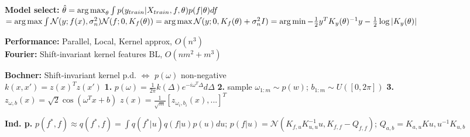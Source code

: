 \textbf{Model select:} $\hat{\theta} = \operatorname*{arg\,max}_\theta \int p(y_{train} | X_{train}, f, \theta) p(f | \theta) df$\\
$= \operatorname*{arg\,max} \int \mathcal{N}(y; f(x), \sigma_n^2) \mathcal{N}(f; 0, K_f(\theta))
= \operatorname*{arg\,max} \\ \mathcal{N}(y; 0, K_f(\theta) + \sigma_n^2 I)
= \operatorname*{arg\,min} -\frac{1}{2}y^T K_y(\theta)^{-1}y - \frac{1}{2} \log |K_y(\theta)|$\\
\begin{comment}
	\textbf{Intuition:} We average over all possible functions, that means that the model must balance out fitting the data (likelihood) and obeying the prior (prior).\\
	\textbf{CV:} In cross-validation, we find the parameters that fit best for one particular case, which can lead to overfitting more quickly.\\
	The parameters are often $[\sigma_p, \sigma_n, h]$.\\
\end{comment}

\textbf{Performance:} Parallel, Local, Kernel approx, $O(n^3)$\\

\textbf{Fourier:} Shift-invariant kernel features BL, $O(nm^2 + m^3)$\\
\begin{comment}
	The Gaussian kernel is a standart normal Gaussian in the Fourier Space.\\
\end{comment} 

\textbf{Bochner:} Shift-invariant kernel p.d. $\Leftrightarrow$ $p(\omega)$ non-negative\\

$k(x,x') = z(x)^T z(x')$
\textbf{1.} $p(\omega) = \frac{1}{2 \pi} k(\Delta) e^{-i \omega^T \Delta} d \Delta$
\textbf{2.} sample $\omega_{1:m} \sim p(w)$; $b_{1:m} \sim U([0,2 \pi])$
\textbf{3.} $z_{\omega, b}(x) = \sqrt{2} \cos (\omega^T x + b)$
$z(x) = \frac{1}{\sqrt{m}} [z_{\omega_i, b_i}(x), ...]^T$

\textbf{Ind. p.}
$p(f^*, f) \approx q(f^*, f) = \int q(f^* | u) q(f | u) p(u) du$;
$p(f|u) = \mathcal{N}(K_{f,u}K_{u,u}^{-1}u, K_{f,f} - Q_{f,f})$;
$Q_{a,b} = K_{a,u} K{u,u}^{-1}K_{u,b}$
\begin{comment}
;$f \rightarrow f^*$
\end{comment}
\begin{comment}
$p(f^*|u) = \mathcal{N}(K_{f^*,u}K_{u,u}^{-1}u, K_{f^*,f^*} - Q_{f^*,f^*})$
\end{comment}



